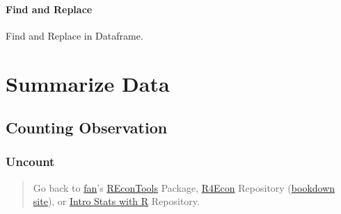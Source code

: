 \documentclass[
]{book}
\newenvironment{Shaded}{\begin{snugshade}}{\end{snugshade}}
\newcommand{\CommentTok}[1]{\textcolor[rgb]{0.56,0.35,0.01}{\textit{#1}}}
\newcommand{\KeywordTok}[1]{\textcolor[rgb]{0.13,0.29,0.53}{\textbf{#1}}}
\newcommand{\NormalTok}[1]{#1}
\newcommand{\OperatorTok}[1]{\textcolor[rgb]{0.81,0.36,0.00}{\textbf{#1}}}
\newcommand{\StringTok}[1]{\textcolor[rgb]{0.31,0.60,0.02}{#1}}
\begin{document}
\hypertarget{find-and-replace-1}{%
\subsubsection{Find and Replace}\label{find-and-replace-1}}

Find and Replace in Dataframe.

\begin{Shaded}
\end{Shaded}

\hypertarget{summarize-data}{%
\chapter{Summarize Data}\label{summarize-data}}

\hypertarget{counting-observation}{%
\section{Counting Observation}\label{counting-observation}}

\hypertarget{uncount}{%
\subsection{Uncount}\label{uncount}}

\begin{quote}
Go back to \href{http://fanwangecon.github.io/CodeDynaAsset/}{fan}'s \href{https://fanwangecon.github.io/REconTools/}{REconTools} Package, \href{https://fanwangecon.github.io/R4Econ/}{R4Econ} Repository (\href{https://fanwangecon.github.io/R4Econ/bookdown}{bookdown site}), or \href{https://fanwangecon.github.io/Stat4Econ/}{Intro Stats with R} Repository.
\end{quote}
\end{document}

